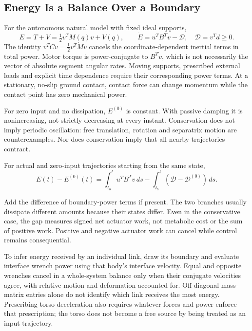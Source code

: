 \subsection{Energy Is a Balance Over a Boundary}
For the autonomous natural model with fixed ideal supports,
\begin{equation}
E=T+V=\tfrac12v^TM(q)v+V(q),\qquad
\dot E=u^TB^Tv-\mathcal D,\quad \mathcal D=v^Td\geq0.
\label{eq:ch7:total-energy}
\end{equation}
\label{eq:ch7:ZTCF-energy}
\label{eq:ch7:energy-conservation}
\label{eq:ch7:energy-dissipation}
\label{eq:ch7:dissipation-rate}
\label{eq:ch7:control-power}
\label{eq:ch7:energy-added}
The identity $v^TCv=\tfrac12v^T\dot Mv$ cancels the coordinate-dependent inertial terms in total power. Motor torque is power-conjugate to $B^Tv$, which is not necessarily the vector of absolute segment angular rates. Moving supports, prescribed external loads and explicit time dependence require their corresponding power terms. At a stationary, no-slip ground contact, contact force can change momentum while the contact point has zero mechanical power.

For zero input and no dissipation, $E^{(0)}$ is constant. With passive damping it is nonincreasing, not strictly decreasing at every instant. Conservation does not imply periodic oscillation: free translation, rotation and separatrix motion are counterexamples. Nor does conservation imply that all nearby trajectories contract.

For actual and zero-input trajectories starting from the same state,
\begin{equation}
E(t)-E^{(0)}(t)=\int_{t_b}^t u^TB^Tv\,ds
-\int_{t_b}^t(\mathcal D-\mathcal D^{(0)})\,ds.
\label{eq:ch7:energy-difference}
\end{equation}

Add the difference of boundary-power terms if present. The two branches usually dissipate different amounts because their states differ. Even in the conservative case, the gap measures signed net actuator work, not metabolic cost or the sum of positive work. Positive and negative actuator work can cancel while control remains consequential.

To infer energy received by an individual link, draw its boundary and evaluate interface wrench power using that body's interface velocity. Equal and opposite wrenches cancel in a whole-system balance only when their conjugate velocities agree, with relative motion and deformation accounted for. Off-diagonal mass-matrix entries alone do not identify which link receives the most energy. Prescribing torso deceleration also requires whatever forces and power enforce that prescription; the torso does not become a free source by being treated as an input trajectory.

